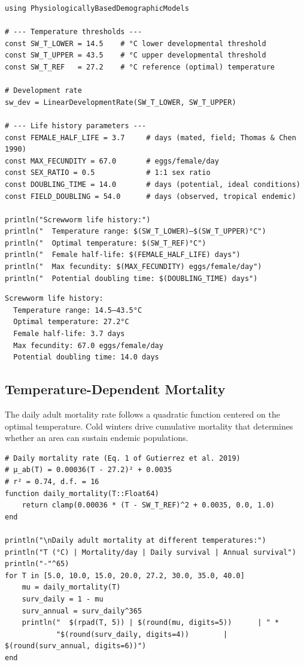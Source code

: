 \begin{verbatim}
using PhysiologicallyBasedDemographicModels

# --- Temperature thresholds ---
const SW_T_LOWER = 14.5    # °C lower developmental threshold
const SW_T_UPPER = 43.5    # °C upper developmental threshold
const SW_T_REF   = 27.2    # °C reference (optimal) temperature

# Development rate
sw_dev = LinearDevelopmentRate(SW_T_LOWER, SW_T_UPPER)

# --- Life history parameters ---
const FEMALE_HALF_LIFE = 3.7     # days (mated, field; Thomas & Chen 1990)
const MAX_FECUNDITY = 67.0       # eggs/female/day
const SEX_RATIO = 0.5            # 1:1 sex ratio
const DOUBLING_TIME = 14.0       # days (potential, ideal conditions)
const FIELD_DOUBLING = 54.0      # days (observed, tropical endemic)

println("Screwworm life history:")
println("  Temperature range: $(SW_T_LOWER)–$(SW_T_UPPER)°C")
println("  Optimal temperature: $(SW_T_REF)°C")
println("  Female half-life: $(FEMALE_HALF_LIFE) days")
println("  Max fecundity: $(MAX_FECUNDITY) eggs/female/day")
println("  Potential doubling time: $(DOUBLING_TIME) days")
\end{verbatim}




\begin{verbatim}
Screwworm life history:
  Temperature range: 14.5–43.5°C
  Optimal temperature: 27.2°C
  Female half-life: 3.7 days
  Max fecundity: 67.0 eggs/female/day
  Potential doubling time: 14.0 days
\end{verbatim}



\subsection{Temperature-Dependent Mortality}



\label{7793223790332784479}{}


The daily adult mortality rate follows a quadratic function centered on the optimal temperature. Cold winters drive cumulative mortality that determines whether an area can sustain endemic populations.




\begin{verbatim}
# Daily mortality rate (Eq. 1 of Gutierrez et al. 2019)
# µ_ab(T) = 0.00036(T - 27.2)² + 0.0035
# r² = 0.74, d.f. = 16
function daily_mortality(T::Float64)
    return clamp(0.00036 * (T - SW_T_REF)^2 + 0.0035, 0.0, 1.0)
end

println("\nDaily adult mortality at different temperatures:")
println("T (°C) | Mortality/day | Daily survival | Annual survival")
println("-"^65)
for T in [5.0, 10.0, 15.0, 20.0, 27.2, 30.0, 35.0, 40.0]
    mu = daily_mortality(T)
    surv_daily = 1 - mu
    surv_annual = surv_daily^365
    println("  $(rpad(T, 5)) | $(round(mu, digits=5))      | " *
            "$(round(surv_daily, digits=4))        | $(round(surv_annual, digits=6))")
end
\end{verbatim}




